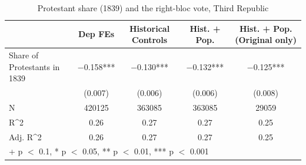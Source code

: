 \begin{table}
\centering
\caption{Protestant share (1839) and the right-bloc vote, Third Republic}
\centering
\begin{tabular}[t]{lcccc}
\toprule
  & Dep FEs & Historical Controls & Hist. + Pop. & Hist. + Pop. (Original only)\\
\midrule
Share of Protestants in 1839 & \num{-0.158}*** & \num{-0.130}*** & \num{-0.132}*** & \num{-0.125}***\\
 & (\num{0.007}) & (\num{0.006}) & (\num{0.006}) & (\num{0.008})\\
\midrule
N & \num{420125} & \num{363085} & \num{363085} & \num{29059}\\
R\textasciicircum{}2 & \num{0.26} & \num{0.27} & \num{0.27} & \num{0.25}\\
Adj. R\textasciicircum{}2 & \num{0.26} & \num{0.27} & \num{0.27} & \num{0.25}\\
\bottomrule
\multicolumn{5}{l}{\rule{0pt}{1em}+ p $<$ 0.1, * p $<$ 0.05, ** p $<$ 0.01, *** p $<$ 0.001}\\
\end{tabular}
\end{table}
